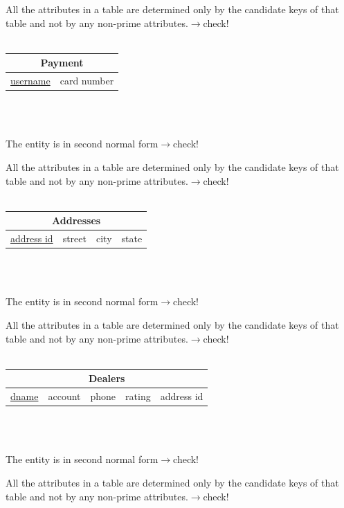 \documentclass[12pt]{article}
\begin{document}
\par All the attributes in a table are determined only by the candidate keys of that table and not by any non-prime attributes.\hfill $\rightarrow$check!\\
~\\
\begin{tabularx}{\textwidth}{|X|X|}
\hline
\multicolumn{2}{|c|}{Payment}\\\hline
\underline{username} & card number\\\hline
\end{tabularx}
~\\~\\
\par The entity is in second normal form\hfill $\rightarrow$check!
\par All the attributes in a table are determined only by the candidate keys of that table and not by any non-prime attributes.\hfill $\rightarrow$check!\\
~\\
\begin{tabularx}{\textwidth}{|X|X|X|X|}
\hline
\multicolumn{4}{|c|}{\cellcolor{green!25}Addresses}\\\hline
\underline{address id} & street & city & state\\\hline
\end{tabularx}
~\\~\\
\par The entity is in second normal form\hfill $\rightarrow$check!
\par All the attributes in a table are determined only by the candidate keys of that table and not by any non-prime attributes.\hfill $\rightarrow$check!\\
~\\
\begin{tabularx}{\textwidth}{|X|X|X|X|X|}
\hline
\multicolumn{5}{|c|}{Dealers}\\\hline
\underline{dname} & account & phone & rating & \cellcolor{green!25}address id\\\hline
\end{tabularx}
~\\~\\
\par The entity is in second normal form\hfill $\rightarrow$check!
\par All the attributes in a table are determined only by the candidate keys of that table and not by any non-prime attributes.\hfill $\rightarrow$check!\\
\end{document}
